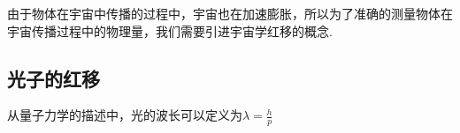 
由于物体在宇宙中传播的过程中，宇宙也在加速膨胀，所以为了准确的测量物体在宇宙传播过程中的物理量，我们需要引进宇宙学红移的概念.

\subsection{光子的红移}
从量子力学的描述中，光的波长可以定义为$\lambda=\frac{h}{p}$